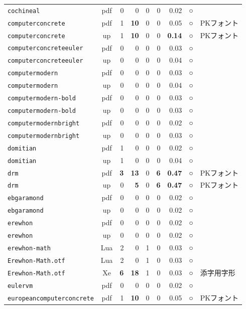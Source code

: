 \begin{longtable}{@{}lcrrrrrcl@{}}
\texttt{cochineal} & pdf & 0 & 0 & 0 & 0 & 0.02 & ○ & \\
\texttt{computerconcrete} & pdf & 1 & \textbf{10} & 0 & 0 & 0.05 & ○ & PKフォント\\
\texttt{computerconcrete} & up & 1 & \textbf{10} & 0 & 0 & \textbf{0.14} & ○ & PKフォント\\
\texttt{computerconcreteeuler} & pdf & 0 & 0 & 0 & 0 & 0.03 & ○ & \\
\texttt{computerconcreteeuler} & up & 0 & 0 & 0 & 0 & 0.04 & ○ & \\
\texttt{computermodern} & pdf & 0 & 0 & 0 & 0 & 0.03 & ○ & \\
\texttt{computermodern} & up & 0 & 0 & 0 & 0 & 0.04 & ○ & \\
\texttt{computermodern-bold} & pdf & 0 & 0 & 0 & 0 & 0.03 & ○ & \\
\texttt{computermodern-bold} & up & 0 & 0 & 0 & 0 & 0.03 & ○ & \\
\texttt{computermodernbright} & pdf & 0 & 0 & 0 & 0 & 0.02 & ○ & \\
\texttt{computermodernbright} & up & 0 & 0 & 0 & 0 & 0.03 & ○ & \\
\texttt{domitian} & pdf & 1 & 0 & 0 & 0 & 0.02 & ○ & \\
\texttt{domitian} & up & 1 & 0 & 0 & 0 & 0.04 & ○ & \\
\texttt{drm} & pdf & \textbf{3} & \textbf{13} & 0 & \textbf{6} & \textbf{0.47} & ○ & PKフォント\\
\texttt{drm} & up & 0 & \textbf{5} & 0 & \textbf{6} & \textbf{0.47} & ○ & PKフォント\\
\texttt{ebgaramond} & pdf & 0 & 0 & 0 & 0 & 0.02 & ○ & \\
\texttt{ebgaramond} & up & 0 & 0 & 0 & 0 & 0.02 & ○ & \\
\texttt{erewhon} & pdf & 0 & 0 & 0 & 0 & 0.02 & ○ & \\
\texttt{erewhon} & up & 0 & 0 & 0 & 0 & 0.02 & ○ & \\
\texttt{erewhon-math} & Lua & 2 & 0 & 1 & 0 & 0.03 & ○ & \\
\texttt{Erewhon-Math.otf} & Lua & 2 & 0 & 1 & 0 & 0.03 & ○ & \\
\texttt{Erewhon-Math.otf} & Xe & \textbf{6} & \textbf{18} & 1 & 0 & 0.03 & ○ & 添字用字形\\
\texttt{eulervm} & pdf & 0 & 0 & 0 & 0 & 0.02 & ○ & \\
\texttt{europeancomputerconcrete} & pdf & 1 & \textbf{10} & 0 & 0 & 0.05 & ○ & PKフォント\\

\end{longtable}
